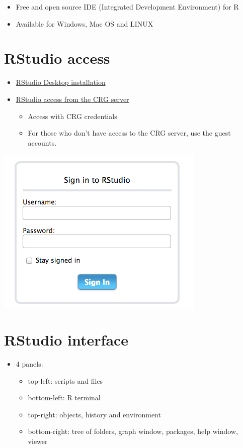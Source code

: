 \documentclass[]{book}
\providecommand{\tightlist}{%
  \setlength{\itemsep}{0pt}\setlength{\parskip}{0pt}}
\begin{document}
\begin{itemize}
\item
  Free and open source IDE (Integrated Development Environment) for R
\item
  Available for Windows, Mac OS and LINUX
\end{itemize}

\hypertarget{rstudio-access}{%
\section{RStudio access}\label{rstudio-access}}

\begin{itemize}
\item
  \href{https://www.rstudio.com/products/rstudio/download}{RStudio Desktop installation}
\item
  \href{http://rstudio.linux.crg.es/}{RStudio access from the CRG server}

  \begin{itemize}
  \tightlist
  \item
    Access with CRG credentials
  \item
    For those who don't have access to the CRG server, use the guest accounts.
  \end{itemize}
\end{itemize}

\includegraphics{images/rstudio_login.png}

\hypertarget{rstudio-interface}{%
\section{RStudio interface}\label{rstudio-interface}}

\begin{itemize}
\tightlist
\item
  4 panels:

  \begin{itemize}
  \tightlist
  \item
    top-left: scripts and files
  \item
    bottom-left: R terminal
  \item
    top-right: objects, history and environment
  \item
    bottom-right: tree of folders, graph window, packages, help window, viewer
  \end{itemize}
\end{itemize}
\end{document}
